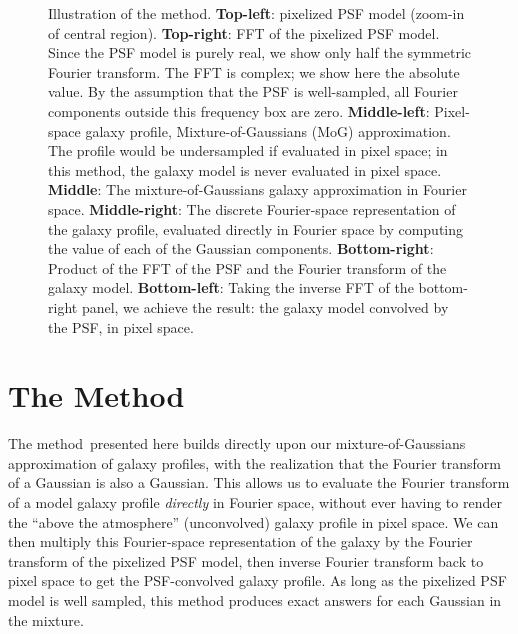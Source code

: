 \documentclass[11pt,preprint]{aastex}
\newcommand{\trick}{method}
\newcommand{\Trick}{Method}
\begin{document}
\begin{figure}
{    Illustration of the \trick.
    \textbf{Top-left}: pixelized PSF model (zoom-in of central region).
    \textbf{Top-right}: 
    FFT of the pixelized PSF model.  Since the PSF model is
    purely real, we show only half the symmetric Fourier transform. The FFT is
    complex; we show here the absolute value.
    By the assumption that the PSF is well-sampled, all Fourier components outside
    this frequency box are zero.
    \textbf{Middle-left}: Pixel-space galaxy profile,
    Mixture-of-Gaussians (MoG) approximation.  The profile would be
    undersampled if evaluated in pixel space; in this \trick, the galaxy model
    is never evaluated in pixel space.
    \textbf{Middle}: The mixture-of-Gaussians galaxy approximation in
    Fourier space.
    \textbf{Middle-right}: The discrete Fourier-space representation of the
    galaxy profile, evaluated directly in Fourier space by computing the value
    of each of the Gaussian components.
    \textbf{Bottom-right}: Product of the FFT of the PSF and the
    Fourier transform of the galaxy model.
    \textbf{Bottom-left}: Taking the inverse FFT of the bottom-right panel,
    we achieve the result: the galaxy model convolved by the PSF, in pixel space.
  }
\end{figure}





\section{The \Trick}

The \trick\ presented here builds directly upon our mixture-of-Gaussians
approximation of galaxy profiles, with the realization that the
Fourier transform of a Gaussian is also a Gaussian.  This allows us to
evaluate the Fourier transform of a model galaxy profile \emph{directly} in Fourier
space, without ever having to render the ``above the atmosphere''
(unconvolved) galaxy profile in pixel space.
We can then multiply this Fourier-space
representation of the galaxy by the Fourier transform of the pixelized
PSF model, then inverse Fourier transform back to pixel space to get
the PSF-convolved galaxy profile.
%
As long as the pixelized PSF model is well sampled, this method produces
exact answers for each Gaussian in the mixture.
\end{document}

